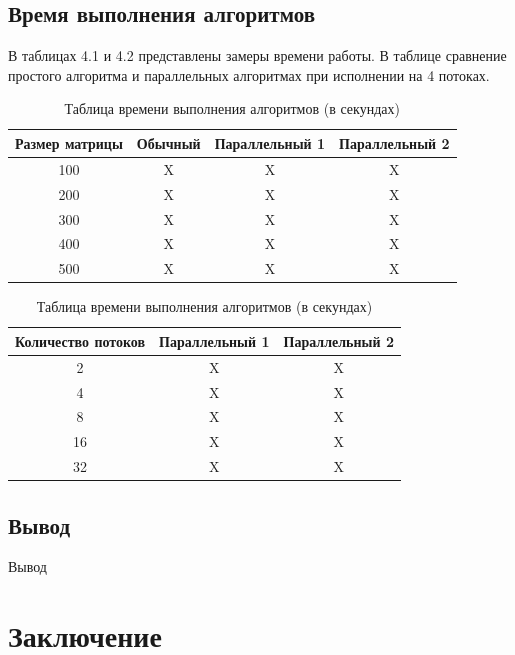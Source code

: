 \documentclass[12pt]{report}
\begin{document}
\section{Время выполнения алгоритмов}

В таблицах 4.1 и 4.2 представлены замеры времени работы. В таблице сравнение простого алгоритма и параллельных алгоритмах при исполнении на 4 потоках.
\clearpage

\begin{table} [h!]
	\caption{Таблица времени выполнения алгоритмов (в секундах)}
	\begin{center}
		\begin{tabular}{|c c c c|} 
		 	\hline
			Размер матрицы & Обычный & Параллельный 1 & Параллельный 2 \\  
		 	\hline
		 	100 & X & X & X \\
		 	\hline
		 	200 & X & X & X\\
		 	\hline
			300 & X & X & X \\
			\hline
			400 & X & X & X \\
			\hline
			500 & X & X & X \\
			\hline
		\end{tabular}
	\end{center}
\end{table}

\begin{table} [h!]
	\caption{Таблица времени выполнения алгоритмов (в секундах)}
	\begin{center}
		\begin{tabular}{|c c c|} 
			\hline
			Количество потоков & Параллельный 1 & Параллельный 2  \\  
			\hline
			2 & X & X  \\
			\hline
			4 & X & X  \\
			\hline
			8 & X & X  \\
			\hline
			16 & X & X \\
			\hline
			32 & X & X  \\
			\hline
		\end{tabular}
	\end{center}
\end{table}

\section{Вывод}

Вывод

\chapter*{Заключение}
\end{document}
